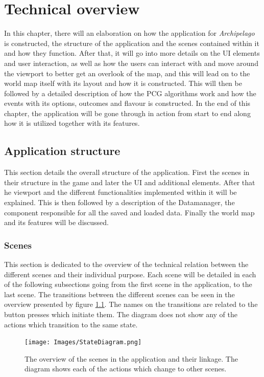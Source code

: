 \chapter{Technical overview}
\label{sec:tech}
In this chapter, there will an elaboration on how the application for \textit{Archipelago} is constructed, the structure of the application and the scenes contained within it and how they function. After that, it will go into more details on the UI elements and user interaction, as well as how the users can interact with and move around the viewport to better get an overlook of the map, and this will lead on to the world map itself with its layout and how it is constructed. This will then be followed by a detailed description of how the PCG algorithms work and how the events with its options, outcomes and flavour is constructed. In the end of this chapter, the application will be gone through in action from start to end along how it is utilized together with its features.

\section{Application structure}
This section details the overall structure of the application.
First the scenes in their structure in the game and later the UI and additional elements. After that he viewport and the different functionalities implemented within it will be explained. This is then followed by a description of the Datamanager, the component responsible for all the saved and loaded data.
Finally the world map and its features will be discussed.

\subsection{Scenes}
\label{sec:scen}
This section is dedicated to the overview of the technical relation between the different scenes and their individual purpose. Each scene will be detailed in each of the following subsections going from the first scene in the application, to the last scene.
The transitions between the different scenes can be seen in the overview presented by figure \ref{fig:appState}. The names on the transitions are related to the button presses which initiate them. 
The diagram does not show any of the actions which transition to the same state.

\begin{figure}[!ht]
    \centering
    \texttt{[image: Images/StateDiagram.png]}
    \caption{The overview of the scenes in the application and their linkage. The diagram shows each of the actions which change to other scenes.}
    \label{fig:appState}
\end{figure}

